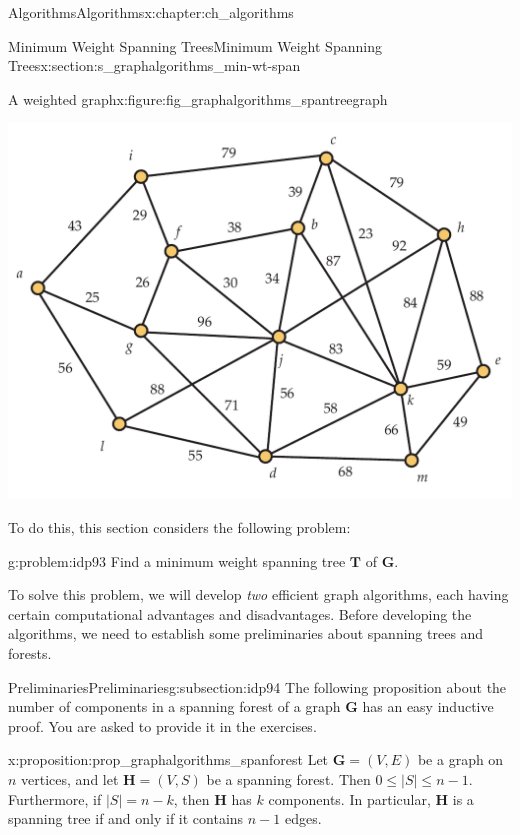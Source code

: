 \documentclass[oneside,10pt,]{book}
\numberwithin{equation}{section}
\newcommand{\GVE}{\mathbf{G}=(V,E)}
\newcommand{\bfG}{\mathbf{G}}
\newcommand{\bfH}{\mathbf{H}}
\newcommand{\bfT}{\mathbf{T}}
\begin{document}
\begin{chapterptx}{Algorithms}{}{Algorithms}{}{}{x:chapter:ch_algorithms}
\begin{sectionptx}{Minimum Weight Spanning Trees}{}{Minimum Weight Spanning Trees}{}{}{x:section:s_graphalgorithms_min-wt-span}
\begin{introduction}{}
\begin{figureptx}{A weighted graph}{x:figure:fig_graphalgorithms_spantreegraph}{}%
\begin{image}{0.05}{0.9}{0.05}%
\includegraphics[width=\linewidth]{images/spantreegraph}
\end{image}%
\tcblower
\end{figureptx}%
To do this, this section considers the following problem:%
\begin{problem}{}{g:problem:idp93}%
Find a minimum weight spanning tree \(\bfT\) of \(\bfG\).%
\end{problem}
To solve this problem, we will develop \emph{two} efficient graph algorithms, each having certain computational advantages and disadvantages. Before developing the algorithms, we need to establish some preliminaries about spanning trees and forests.%
\end{introduction}%
%
%
\typeout{************************************************}
\typeout{************************************************}
%
\begin{subsectionptx}{Preliminaries}{}{Preliminaries}{}{}{g:subsection:idp94}
The following proposition about the number of components in a spanning forest of a graph \(\bfG\) has an easy inductive proof. You are asked to provide it in the exercises.%
\begin{proposition}{}{}{x:proposition:prop_graphalgorithms_spanforest}%
Let \(\GVE\) be a graph on \(n\) vertices, and let \(\bfH=(V,S)\) be a spanning forest. Then \(0\le |S|\le n-1\). Furthermore, if \(|S|= n-k\), then \(\bfH\) has \(k\) components. In particular, \(\bfH\) is a spanning tree if and only if it contains \(n-1\) edges.%

\end{proposition}
\end{subsectionptx}
\end{sectionptx}
\end{chapterptx}
\end{document}
